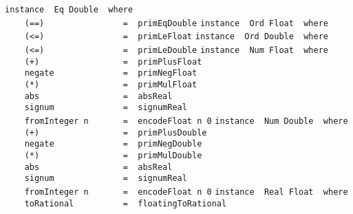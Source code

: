 %
\eprogB\noindent\bprogB
\mbox{\tt instance\ \ Eq\ Double\ \ where}\\
\mbox{\tt \ \ \ \ (==)\ \ \ \ \ \ \ \ \ \ \ \ \ \ \ \ =\ \ primEqDouble}
%
\eprogB\noindent\bprogB
\mbox{\tt instance\ \ Ord\ Float\ \ where}\\
\mbox{\tt \ \ \ \ (<=)\ \ \ \ \ \ \ \ \ \ \ \ \ \ \ \ =\ \ primLeFloat}
%
\eprogB\noindent\bprogB
\mbox{\tt instance\ \ Ord\ Double\ \ where}\\
\mbox{\tt \ \ \ \ (<=)\ \ \ \ \ \ \ \ \ \ \ \ \ \ \ \ =\ \ primLeDouble}
%
\eprogB\noindent\bprogB
\mbox{\tt instance\ \ Num\ Float\ \ where}\\
\mbox{\tt \ \ \ \ (+)\ \ \ \ \ \ \ \ \ \ \ \ \ \ \ \ \ =\ \ primPlusFloat}\\
\mbox{\tt \ \ \ \ negate\ \ \ \ \ \ \ \ \ \ \ \ \ \ =\ \ primNegFloat}\\
\mbox{\tt \ \ \ \ (*)\ \ \ \ \ \ \ \ \ \ \ \ \ \ \ \ \ =\ \ primMulFloat}\\
\mbox{\tt \ \ \ \ abs\ \ \ \ \ \ \ \ \ \ \ \ \ \ \ \ \ =\ \ absReal}\\
\mbox{\tt \ \ \ \ signum\ \ \ \ \ \ \ \ \ \ \ \ \ \ =\ \ signumReal}\\
\mbox{\tt \ \ \ \ fromInteger\ n\ \ \ \ \ \ \ =\ \ encodeFloat\ n\ 0}
%
\eprogB\noindent\bprogB
\mbox{\tt instance\ \ Num\ Double\ \ where}\\
\mbox{\tt \ \ \ \ (+)\ \ \ \ \ \ \ \ \ \ \ \ \ \ \ \ \ =\ \ primPlusDouble}\\
\mbox{\tt \ \ \ \ negate\ \ \ \ \ \ \ \ \ \ \ \ \ \ =\ \ primNegDouble}\\
\mbox{\tt \ \ \ \ (*)\ \ \ \ \ \ \ \ \ \ \ \ \ \ \ \ \ =\ \ primMulDouble}\\
\mbox{\tt \ \ \ \ abs\ \ \ \ \ \ \ \ \ \ \ \ \ \ \ \ \ =\ \ absReal}\\
\mbox{\tt \ \ \ \ signum\ \ \ \ \ \ \ \ \ \ \ \ \ \ =\ \ signumReal}\\
\mbox{\tt \ \ \ \ fromInteger\ n\ \ \ \ \ \ \ =\ \ encodeFloat\ n\ 0}
%
\eprogB\noindent\bprogB
\mbox{\tt instance\ \ Real\ Float\ \ where}\\
\mbox{\tt \ \ \ \ toRational\ \ \ \ \ \ \ \ \ \ =\ \ floatingToRational}
%
\eprogB\noindent\bprogB
